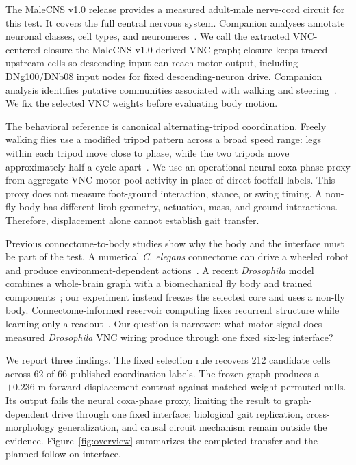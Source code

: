 \documentclass[conference]{IEEEtran}
\begin{document}
The MaleCNS v1.0 release provides a measured adult-male nerve-cord circuit for this test. It covers the full central nervous system. Companion analyses annotate neuronal classes, cell types, and neuromeres~\cite{takemura2024manc,marin2024annotation}. We call the extracted VNC-centered closure the MaleCNS-v1.0-derived VNC graph; closure keeps traced upstream cells so descending input can reach motor output, including DNg100/DNb08 input nodes for fixed descending-neuron drive. Companion analysis identifies putative communities associated with walking and steering~\cite{cheong2026premotor}. We fix the selected VNC weights before evaluating body motion.

The behavioral reference is canonical alternating-tripod coordination. Freely walking flies use a modified tripod pattern across a broad speed range: legs within each tripod move close to phase, while the two tripods move approximately half a cycle apart~\cite{chun2021tripod}. We use an operational neural coxa-phase proxy from aggregate VNC motor-pool activity in place of direct footfall labels. This proxy does not measure foot-ground interaction, stance, or swing timing. A non-fly body has different limb geometry, actuation, mass, and ground interactions. Therefore, displacement alone cannot establish gait transfer.

Previous connectome-to-body studies show why the body and the interface must be part of the test. A numerical \textit{C. elegans} connectome can drive a wheeled robot and produce environment-dependent actions~\cite{valencia2023robot}. A recent \textit{Drosophila} model combines a whole-brain graph with a biomechanical fly body and trained components~\cite{jin2026flygm}; our experiment instead freezes the selected core and uses a non-fly body. Connectome-informed reservoir computing fixes recurrent structure while learning only a readout~\cite{damicelli2022reservoir,suarez2024conn2res}. Our question is narrower: what motor signal does measured \textit{Drosophila} VNC wiring produce through one fixed six-leg interface?

We report three findings. The fixed selection rule recovers 212 candidate cells across 62 of 66 published coordination labels. The frozen graph produces a $+0.236$ m forward-displacement contrast against matched weight-permuted nulls. Its output fails the neural coxa-phase proxy, limiting the result to graph-dependent drive through one fixed interface; biological gait replication, cross-morphology generalization, and causal circuit mechanism remain outside the evidence.
Figure~\ref{fig:overview} summarizes the completed transfer and the planned follow-on interface.
\end{document}
